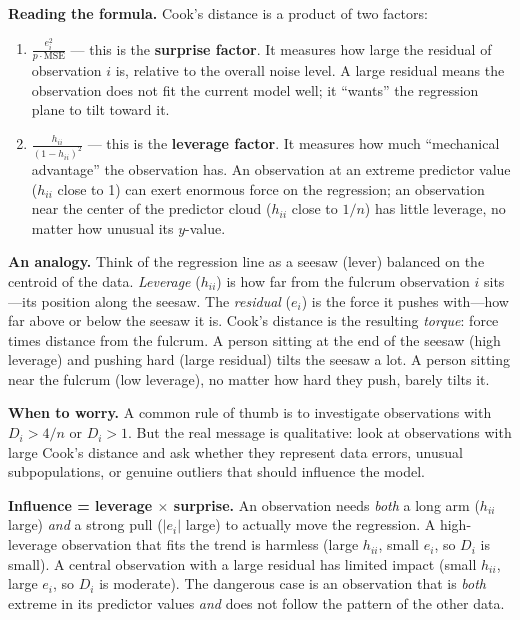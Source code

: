 \documentclass[11pt,a4paper]{article}
\theoremstyle{plain}
\theoremstyle{definition}
\begin{document}
\noindent\textbf{Reading the formula.}
Cook's distance is a product of two factors:
\begin{enumerate}[nosep]
  \item $\frac{e_i^2}{p\cdot\text{MSE}}$ --- this is the \textbf{surprise factor}.
    It measures how large the residual of observation $i$ is, relative to the overall noise level.
    A large residual means the observation does not fit the current model well; it ``wants'' the regression plane to tilt toward it.
  \item $\frac{h_{ii}}{(1 - h_{ii})^2}$ --- this is the \textbf{leverage factor}.
    It measures how much ``mechanical advantage'' the observation has.
    An observation at an extreme predictor value ($h_{ii}$ close to 1) can exert enormous force on the regression; an observation near the center of the predictor cloud ($h_{ii}$ close to $1/n$) has little leverage, no matter how unusual its $y$-value.
\end{enumerate}

\medskip
\noindent\textbf{An analogy.}
Think of the regression line as a seesaw (lever) balanced on the centroid of the data.
\emph{Leverage} ($h_{ii}$) is how far from the fulcrum observation $i$ sits---its position along the seesaw.
The \emph{residual} ($e_i$) is the force it pushes with---how far above or below the seesaw it is.
Cook's distance is the resulting \emph{torque}: force times distance from the fulcrum.
A person sitting at the end of the seesaw (high leverage) and pushing hard (large residual) tilts the seesaw a lot. A person sitting near the fulcrum (low leverage), no matter how hard they push, barely tilts it.

\medskip
\noindent\textbf{When to worry.}
A common rule of thumb is to investigate observations with $D_i > 4/n$ or $D_i > 1$.
But the real message is qualitative: look at observations with large Cook's distance
and ask whether they represent data errors, unusual subpopulations, or genuine outliers
that should influence the model.

\begin{keyinsight}
\textbf{Influence = leverage $\times$ surprise.}
An observation needs \emph{both} a long arm ($h_{ii}$ large) \emph{and}
a strong pull ($|e_i|$ large) to actually move the regression.
A high-leverage observation that fits the trend is harmless
(large $h_{ii}$, small $e_i$, so $D_i$ is small).
A central observation with a large residual has limited impact
(small $h_{ii}$, large $e_i$, so $D_i$ is moderate).
The dangerous case is an observation that is \emph{both} extreme in its
predictor values \emph{and} does not follow the pattern of the other data.
\end{keyinsight}
\end{document}
